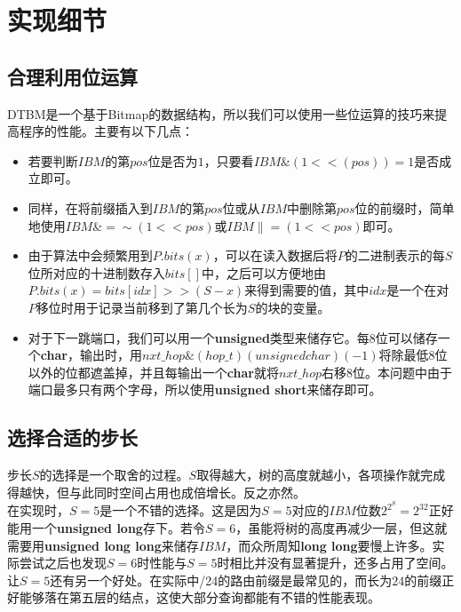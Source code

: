 
\section{实现细节}

\subsection{合理利用位运算}

DTBM是一个基于Bitmap的数据结构，所以我们可以使用一些位运算的技巧来提高程序的性能。主要有以下几点：
\begin{itemize}
\item 若要判断$IBM$的第$pos$位是否为$1$，只要看$IBM \& (1 << (pos)) = 1$是否成立即可。
\item 同样，在将前缀插入到$IBM$的第$pos$位或从$IBM$中删除第$pos$位的前缀时，简单地使用$IBM \&= \sim(1 << pos)$或$IBM \|= (1 << pos)$即可。
\item 由于算法中会频繁用到$P.bits(x)$，可以在读入数据后将$P$的二进制表示的每$S$位所对应的十进制数存入$bits[]$中，之后可以方便地由$P.bits(x) = bits[idx] >> (S - x)$来得到需要的值，其中$idx$是一个在对$P$移位时用于记录当前移到了第几个长为$S$的块的变量。
\item 对于下一跳端口，我们可以用一个\textbf{unsigned}类型来储存它。每8位可以储存一个\textbf{char}，输出时，用$nxt\_hop \& (hop\_t)(unsigned char)(-1)$将除最低8位以外的位都遮盖掉，并且每输出一个\textbf{char}就将$nxt\_hop$右移8位。本问题中由于端口最多只有两个字母，所以使用\textbf{unsigned short}来储存即可。
\end{itemize}

\subsection{选择合适的步长}

步长$S$的选择是一个取舍的过程。$S$取得越大，树的高度就越小，各项操作就完成得越快，但与此同时空间占用也成倍增长。反之亦然。\\
\indent
在实现时，$S = 5$是一个不错的选择。这是因为$S = 5$对应的$IBM$位数$2^{2^{S}}=2^{32}$正好能用一个\textbf{unsigned long}存下。若令$S = 6$，虽能将树的高度再减少一层，但这就需要用\textbf{unsigned long long}来储存$IBM$，而众所周知\textbf{long long}要慢上许多。实际尝试之后也发现$S = 6$时性能与$S = 5$时相比并没有显著提升，还多占用了空间。\\
\indent
让$S = 5$还有另一个好处。在实际中/24的路由前缀是最常见的，而长为$24$的前缀正好能够落在第五层的结点，这使大部分查询都能有不错的性能表现。\\

